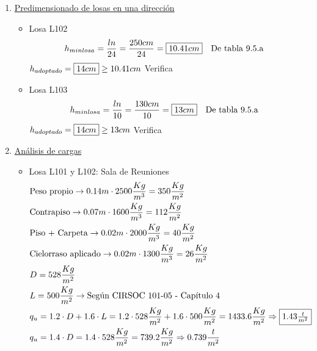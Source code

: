 \begin{enumerate}
\item \underline{Predimensionado de losas en una dirección}\\

\begin{itemize}
\item Losa L102
\begin{align*}
& h_{min losa} = \frac{ln}{24} = \frac{250cm}{24} = \framebox{$10.41cm$} \quad \text{De tabla 9.5.a}
\end{align*}
$h_{adoptado} = \framebox{$14 cm$} \geq 10.41cm$ Verifica \\
\item Losa L103
\begin{align*}
& h_{min losa} = \frac{ln}{10} = \frac{130cm}{10} = \framebox{$13cm$} \quad \text{De tabla 9.5.a}
\end{align*}
$h_{adoptado} = \framebox{$14 cm$} \geq 13cm$ Verifica \\
\end{itemize}

\item \underline{Análisis de cargas}\\

\begin{itemize}
\item Losa L101 y L102: Sala de Reuniones
\begin{align*}
& \text{Peso propio} \rightarrow 0.14m \cdot 2500 \frac{Kg}{m^3} = 350 \frac{Kg}{m^2}\\
& \text{Contrapiso} \rightarrow 0.07m \cdot 1600 \frac{Kg}{m^3} = 112 \frac{Kg}{m^2}\\
& \text{Piso + Carpeta} \rightarrow 0.02m \cdot 2000 \frac{Kg}{m^3} = 40 \frac{Kg}{m^2}\\
& \text{Cielorraso aplicado} \rightarrow  0.02m \cdot 1300 \frac{Kg}{m^3} = 26 \frac{Kg}{m^2}\\
& D = 528 \frac{Kg}{m^2}\\
& L = 500 \frac{Kg}{m^2} \rightarrow \text{Según CIRSOC 101-05 - Capítulo 4}\\
& q_u = 1.2 \cdot D + 1.6 \cdot L = 1.2 \cdot 528 \frac{Kg}{m^2} + 1.6 \cdot 500 \frac{Kg}{m^2} = 1433.6 \frac{Kg}{m^2} \Rightarrow \framebox{$1.43 \frac{t}{m^2}$} \\
& q_u = 1.4 \cdot D = 1.4 \cdot 528 \frac{Kg}{m^2} = 739.2 \frac{Kg}{m^2} \Rightarrow 0.739 \frac{t}{m^2}
\end{align*}


\end{itemize}
\end{enumerate}
